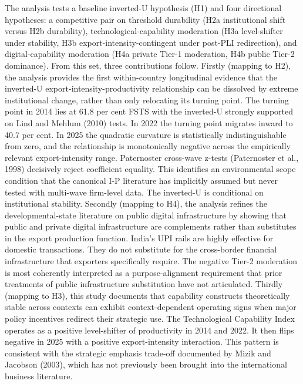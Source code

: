 \documentclass[
  12pt]{article}
\begin{document}
The analysis tests a baseline inverted-U hypothesis (H1) and four
directional hypotheses: a competitive pair on threshold durability (H2a
institutional shift versus H2b durability), technological-capability
moderation (H3a level-shifter under stability, H3b
export-intensity-contingent under post-PLI redirection), and
digital-capability moderation (H4a private Tier-1 moderation, H4b public
Tier-2 dominance). From this set, three contributions follow. Firstly
(mapping to H2), the analysis provides the first within-country
longitudinal evidence that the inverted-U export-intensity-productivity
relationship can be dissolved by extreme institutional change, rather
than only relocating its turning point. The turning point in 2014 lies
at 61.8 per cent FSTS with the inverted-U strongly supported on Lind and
Mehlum (2010) tests. In 2022 the turning point migrates inward to 40.7
per cent. In 2025 the quadratic curvature is statistically
indistinguishable from zero, and the relationship is monotonically
negative across the empirically relevant export-intensity range.
Paternoster cross-wave z-tests (Paternoster et al., 1998) decisively
reject coefficient equality. This identifies an environmental scope
condition that the canonical I-P literature has implicitly assumed but
never tested with multi-wave firm-level data. The inverted-U is
conditional on institutional stability. Secondly (mapping to H4), the
analysis refines the developmental-state literature on public digital
infrastructure by showing that public and private digital infrastructure
are complements rather than substitutes in the export production
function. India's UPI rails are highly effective for domestic
transactions. They do not substitute for the cross-border financial
infrastructure that exporters specifically require. The negative Tier-2
moderation is most coherently interpreted as a purpose-alignment
requirement that prior treatments of public infrastructure substitution
have not articulated. Thirdly (mapping to H3), this study documents that
capability constructs theoretically stable across contexts can exhibit
context-dependent operating signs when major policy incentives redirect
their strategic use. The Technological Capability Index operates as a
positive level-shifter of productivity in 2014 and 2022. It then flips
negative in 2025 with a positive export-intensity interaction. This
pattern is consistent with the strategic emphasis trade-off documented
by Mizik and Jacobson (2003), which has not previously been brought into
the international business literature.
\end{document}
